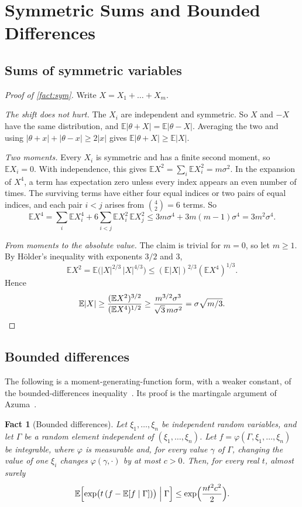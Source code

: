 \documentclass[11pt,letterpaper]{article}
\newtheorem{fact}[theorem]{Fact}
\newcommand{\E}{\mathbb{E}}
\newcommand{\1}{\mathbf{1}}
\begin{document}
\appendix
\section{Symmetric Sums and Bounded Differences}\label{app:facts}

\subsection{Sums of symmetric variables}\label{app:sym}

\begin{proof}[Proof of \cref{fact:sym}]
Write $X=X_1+\dots+X_m$.

\emph{The shift does not hurt.} The $X_i$ are independent and symmetric. So $X$ and $-X$ have the same distribution, and $\E|\theta+X|=\E|\theta-X|$. Averaging the two and using $|\theta+x|+|\theta-x|\ge2|x|$ gives $\E|\theta+X|\ge\E|X|$.

\emph{Two moments.} Every $X_i$ is symmetric and has a finite second moment, so $\E X_i=0$. With independence, this gives $\E X^2=\sum_i\E X_i^2=m\sigma^2$. In the expansion of $X^4$, a term has expectation zero unless every index appears an even number of times. The surviving terms have either four equal indices or two pairs of equal indices, and each pair $i<j$ arises from $\binom42=6$ terms. So
\[
\E X^4=\sum_i\E X_i^4+6\sum_{i<j}\E X_i^2\,\E X_j^2\le3m\sigma^4+3m(m-1)\sigma^4=3m^2\sigma^4.
\]

\emph{From moments to the absolute value.} The claim is trivial for $m=0$, so let $m\ge1$. By H\"older's inequality with exponents $3/2$ and $3$,
\[
\E X^2=\E\bigl(|X|^{2/3}\,|X|^{4/3}\bigr)\le(\E|X|)^{2/3}(\E X^4)^{1/3}.
\]
Hence
\[
\E|X|\ge\frac{(\E X^2)^{3/2}}{(\E X^4)^{1/2}}\ge\frac{m^{3/2}\sigma^3}{\sqrt3\,m\sigma^2}=\sigma\sqrt{m/3}.\qedhere
\]
\end{proof}

\subsection{Bounded differences}\label{app:bd}

The following is a moment-generating-function form, with a weaker constant, of the bounded-differences inequality~\cite{McD89}. Its proof is the martingale argument of Azuma~\cite{Azu67}.

\begin{fact}[Bounded differences]\label{fact:bd}
Let $\xi_1,\dots,\xi_n$ be independent random variables, and let $\Gamma$ be a random element independent of $(\xi_1,\dots,\xi_n)$. Let $f=\varphi(\Gamma,\xi_1,\dots,\xi_n)$ be integrable, where $\varphi$ is measurable and, for every value $\gamma$ of $\Gamma$, changing the value of one $\xi_i$ changes $\varphi(\gamma,\cdot)$ by at most $c>0$. Then, for every real $t$, almost surely
\[
\E\Bigl[\exp\bigl(t\,(f-\E[f\mid\Gamma])\bigr)\Bigm|\Gamma\Bigr]\le\exp\Bigl(\frac{nt^2c^2}2\Bigr).
\]
\end{fact}
\end{document}
